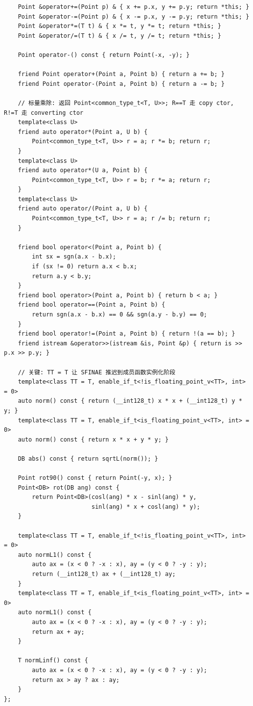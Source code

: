 \begin{verbatim}
	Point &operator+=(Point p) & { x += p.x, y += p.y; return *this; }
	Point &operator-=(Point p) & { x -= p.x, y -= p.y; return *this; }
	Point &operator*=(T t) & { x *= t, y *= t; return *this; }
	Point &operator/=(T t) & { x /= t, y /= t; return *this; }

	Point operator-() const { return Point(-x, -y); }

	friend Point operator+(Point a, Point b) { return a += b; }
	friend Point operator-(Point a, Point b) { return a -= b; }

	// 标量乘除: 返回 Point<common_type_t<T, U>>; R==T 走 copy ctor, R!=T 走 converting ctor
	template<class U>
	friend auto operator*(Point a, U b) {
		Point<common_type_t<T, U>> r = a; r *= b; return r;
	}
	template<class U>
	friend auto operator*(U a, Point b) {
		Point<common_type_t<T, U>> r = b; r *= a; return r;
	}
	template<class U>
	friend auto operator/(Point a, U b) {
		Point<common_type_t<T, U>> r = a; r /= b; return r;
	}

	friend bool operator<(Point a, Point b) {
		int sx = sgn(a.x - b.x);
		if (sx != 0) return a.x < b.x;
		return a.y < b.y;
	}
	friend bool operator>(Point a, Point b) { return b < a; }
	friend bool operator==(Point a, Point b) {
		return sgn(a.x - b.x) == 0 && sgn(a.y - b.y) == 0;
	}
	friend bool operator!=(Point a, Point b) { return !(a == b); }
	friend istream &operator>>(istream &is, Point &p) { return is >> p.x >> p.y; }

	// 关键: TT = T 让 SFINAE 推迟到成员函数实例化阶段
	template<class TT = T, enable_if_t<!is_floating_point_v<TT>, int> = 0>
	auto norm() const { return (__int128_t) x * x + (__int128_t) y * y; }
	template<class TT = T, enable_if_t<is_floating_point_v<TT>, int> = 0>
	auto norm() const { return x * x + y * y; }

	DB abs() const { return sqrtL(norm()); }

	Point rot90() const { return Point(-y, x); }
	Point<DB> rot(DB ang) const {
		return Point<DB>(cosl(ang) * x - sinl(ang) * y,
		                 sinl(ang) * x + cosl(ang) * y);
	}

	template<class TT = T, enable_if_t<!is_floating_point_v<TT>, int> = 0>
	auto normL1() const {
		auto ax = (x < 0 ? -x : x), ay = (y < 0 ? -y : y);
		return (__int128_t) ax + (__int128_t) ay;
	}
	template<class TT = T, enable_if_t<is_floating_point_v<TT>, int> = 0>
	auto normL1() const {
		auto ax = (x < 0 ? -x : x), ay = (y < 0 ? -y : y);
		return ax + ay;
	}

	T normLinf() const {
		auto ax = (x < 0 ? -x : x), ay = (y < 0 ? -y : y);
		return ax > ay ? ax : ay;
	}
};


\end{verbatim}
